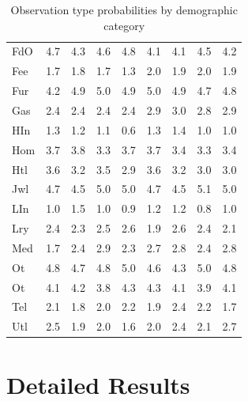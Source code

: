 \begin{table}[!ht]
{\begin{tabular}{lllllllll}
        FdO & 4.7 & 4.3 & 4.6 & 4.8 & 4.1 & 4.1 & 4.5 & 4.2\\
        Fee & 1.7 & 1.8 & 1.7 & 1.3 & 2.0 & 1.9 & 2.0 & 1.9\\
        Fur & 4.2 & 4.9 & 5.0 & 4.9 & 5.0 & 4.9 & 4.7 & 4.8\\
        Gas & 2.4 & 2.4 & 2.4 & 2.4 & 2.9 & 3.0 & 2.8 & 2.9\\
        HIn & 1.3 & 1.2 & 1.1 & 0.6 & 1.3 & 1.4 & 1.0 & 1.0\\
        Hom & 3.7 & 3.8 & 3.3 & 3.7 & 3.7 & 3.4 & 3.3 & 3.4\\
        Htl & 3.6 & 3.2 & 3.5 & 2.9 & 3.6 & 3.2 & 3.0 & 3.0\\
        Jwl & 4.7 & 4.5 & 5.0 & 5.0 & 4.7 & 4.5 & 5.1 & 5.0\\
        LIn & 1.0 & 1.5 & 1.0 & 0.9 & 1.2 & 1.2 & 0.8 & 1.0\\
        Lry & 2.4 & 2.3 & 2.5 & 2.6 & 1.9 & 2.6 & 2.4 & 2.1\\
        Med & 1.7 & 2.4 & 2.9 & 2.3 & 2.7 & 2.8 & 2.4 & 2.8\\
        Ot  & 4.8 & 4.7 & 4.8 & 5.0 & 4.6 & 4.3 & 5.0 & 4.8\\
        Ot  & 4.1 & 4.2 & 3.8 & 4.3 & 4.3 & 4.1 & 3.9 & 4.1\\
        Tel & 2.1 & 1.8 & 2.0 & 2.2 & 1.9 & 2.4 & 2.2 & 1.7\\
        Utl & 2.5 & 1.9 & 2.0 & 1.6 & 2.0 & 2.4 & 2.1 & 2.7\\
        \hline
    \end{tabular}
    }%
    \caption{Observation type probabilities by demographic category}
    \label{tab:dem_vin}
\end{table}

\clearpage
\section{Detailed Results}
\label{det_res}

